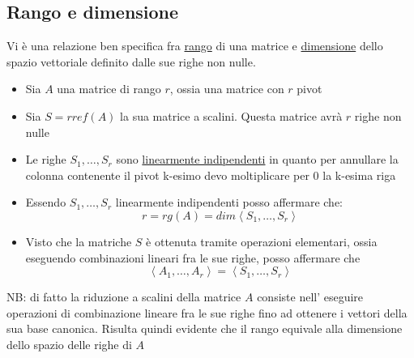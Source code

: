 \documentclass[12pt,a4paper,oneside]{article}
\begin{document}
\subsection{Rango e dimensione}
Vi è una relazione ben specifica fra \underline{rango} di una matrice e  \underline{dimensione} dello spazio vettoriale definito dalle sue righe non nulle.
\begin{itemize}
	\item Sia $A$ una matrice di rango $r$, ossia una matrice con $r$ pivot
	\item Sia $S= rref\left( A \right) $ la sua matrice a scalini. Questa matrice avrà $r$ righe non nulle
	\item Le righe $S_1,\ldots, S_r$ sono \underline{linearmente indipendenti} in quanto per annullare la colonna contenente il pivot k-esimo devo moltiplicare per $0$ la k-esima riga
	\item Essendo $S_1,\ldots,S_r$ linearmente indipendenti posso affermare che:
	      \[
		      r=rg\left( A \right) = dim \left<S_1,\ldots,S_r \right>
	      \]
	\item Visto che la matriche $ S$ è ottenuta tramite operazioni elementari, ossia eseguendo combinazioni lineari fra le sue righe, posso affermare che
	      \[
		      \left<A_1,\ldots,A_r \right> = \left<S_1,\ldots,S_r \right>
	      \]
\end{itemize}
NB: di fatto la riduzione a scalini della matrice $ A $ consiste nell' eseguire operazioni di combinazione lineare fra le sue righe fino ad ottenere i vettori della sua base canonica. Risulta quindi evidente che il rango equivale alla dimensione dello spazio delle righe di $ A $
\end{document}

